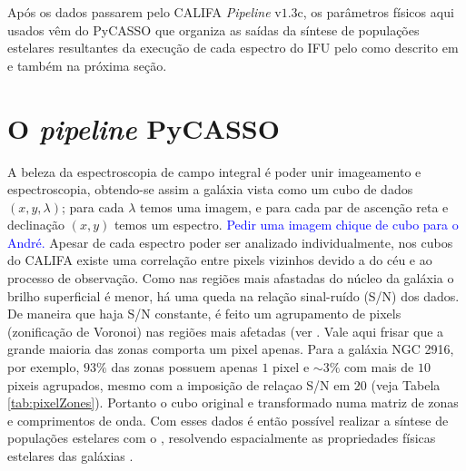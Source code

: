 Após os dados passarem pelo CALIFA {\em Pipeline} v$1.3$c, os parâmetros físicos
aqui usados vêm do PyCASSO que organiza as saídas da síntese de populações
estelares resultantes da execução de cada espectro do IFU pelo \starlight
\citep{CidFernandes2005} como descrito em \citet{CidFernandes2013} e também na
próxima seção.


\section{O {\em pipeline} PyCASSO}
\label{sec:CALePyC:PyCASSO}

A beleza da espectroscopia de campo integral é poder unir imageamento e
espectroscopia, obtendo-se assim a galáxia vista como um cubo de dados  $(x, y,
\lambda)$; para cada $\lambda$ temos uma imagem, e para cada par de ascenção
reta e declinação $(x, y)$ temos um espectro. \ojo \textcolor{blue}{Pedir uma
imagem chique de cubo para o André.} Apesar de cada espectro poder ser analizado
individualmente, nos cubos do CALIFA existe uma correlação entre pixels vizinhos
devido a  do céu e ao processo de observação. Como nas regiões
mais afastadas do núcleo da galáxia o brilho superficial é menor, há uma queda
na relação sinal-ruído (S/N) dos dados. De maneira que haja S/N constante, é
feito um agrupamento de pixels (zonificação de Voronoi) nas regiões mais
afetadas (ver \citep[][sec. 3]{CidFernandes2013}. Vale aqui frisar que a grande
maioria das zonas comporta um pixel apenas. Para a galáxia NGC 2916, por
exemplo, $93\%$ das zonas possuem apenas $1$ pixel e $\sim 3\%$ com mais de $10$
pixeis agrupados, mesmo com a imposição de relaçao S/N em $20$ (veja Tabela
\ref{tab:pixelZones}). Portanto o cubo original e transformado numa matriz de
zonas e comprimentos de onda. Com esses dados é então possível realizar a
síntese de populações estelares com o \starlight, resolvendo espacialmente as
propriedades físicas estelares das galáxias \citep{CidFernandes2013,
CidFernandes2014, GonzalezDelgado2013}.

